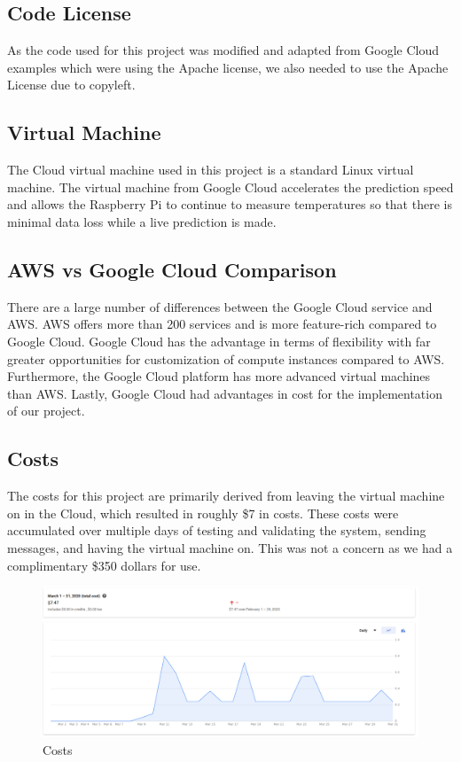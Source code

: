 \documentclass{article}
\begin{document}
\subsection{Code License}
As the code used for this project was modified and adapted from Google Cloud examples which were using the Apache license, we also needed to use the Apache License due to copyleft. 

\subsection{Virtual Machine}
The Cloud virtual machine used in this project is a standard Linux virtual machine. The virtual machine from Google Cloud accelerates the prediction speed and allows the Raspberry Pi to continue to measure temperatures so that there is minimal data loss while a live prediction is made.
\subsection{AWS vs Google Cloud Comparison}
There are a large number of differences between the Google Cloud service and AWS. AWS offers more than 200 services and is more feature-rich compared to Google Cloud. Google Cloud has the advantage in terms of flexibility with far greater opportunities for customization of compute instances compared to AWS. Furthermore, the Google Cloud platform has more advanced virtual machines than AWS. Lastly, Google Cloud had advantages in cost for the implementation of our project.
\subsection{Costs}
The costs for this project are primarily derived from leaving the virtual machine on in the Cloud, which resulted in roughly \$7 in costs. These costs were accumulated over multiple days of testing and validating the system, sending messages, and having the virtual machine on. This was not a concern as we had a complimentary \$350 dollars for use. 
\begin{figure}[h]
    \centering
    \includegraphics[width=.75\linewidth]{costs.png}
    \caption{Costs}
    \label{fig:costs}
\end{figure}
\newpage
\end{document}
